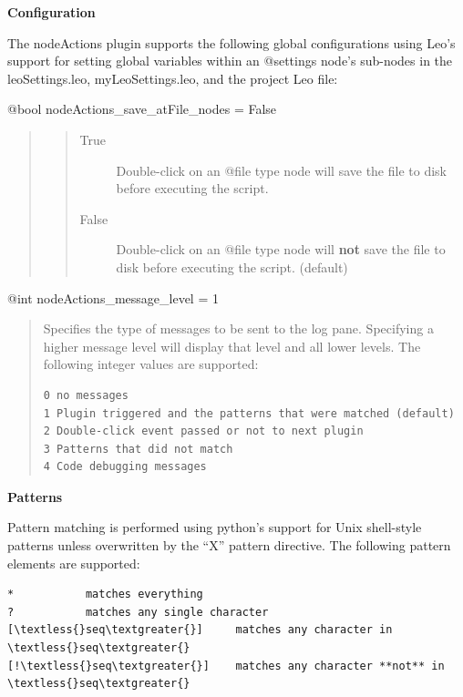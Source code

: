 \documentclass[a4paper,10pt,english]{sphinxmanual}
\begin{document}
\textbf{Configuration}

The nodeActions plugin supports the following global configurations using
Leo's support for setting global variables within an @settings node's
sub-nodes in the leoSettings.leo, myLeoSettings.leo, and the project Leo
file:

@bool nodeActions\_save\_atFile\_nodes = False
\begin{quote}
\begin{quote}\begin{description}
\item[{True}] \leavevmode
Double-click on an @file type node will save the file to disk
before executing the script.

\item[{False}] \leavevmode
Double-click on an @file type node will \textbf{not} save the file to disk
before executing the script. (default)

\end{description}\end{quote}
\end{quote}

@int nodeActions\_message\_level = 1
\begin{quote}

Specifies the type of messages to be sent to the log pane.  Specifying a
higher message level will display that level and all lower levels.
The following integer values are supported:

\begin{Verbatim}[commandchars=\\\{\}]
0 no messages
1 Plugin triggered and the patterns that were matched (default)
2 Double-click event passed or not to next plugin
3 Patterns that did not match
4 Code debugging messages
\end{Verbatim}
\end{quote}

\textbf{Patterns}

Pattern matching is performed using python's support for Unix
shell-style patterns unless overwritten by the ``X'' pattern directive.
The following pattern elements are supported:

\begin{Verbatim}[commandchars=\\\{\}]
*           matches everything
?           matches any single character
[\textless{}seq\textgreater{}]     matches any character in \textless{}seq\textgreater{}
[!\textless{}seq\textgreater{}]    matches any character **not** in \textless{}seq\textgreater{}
\end{Verbatim}
\end{document}
